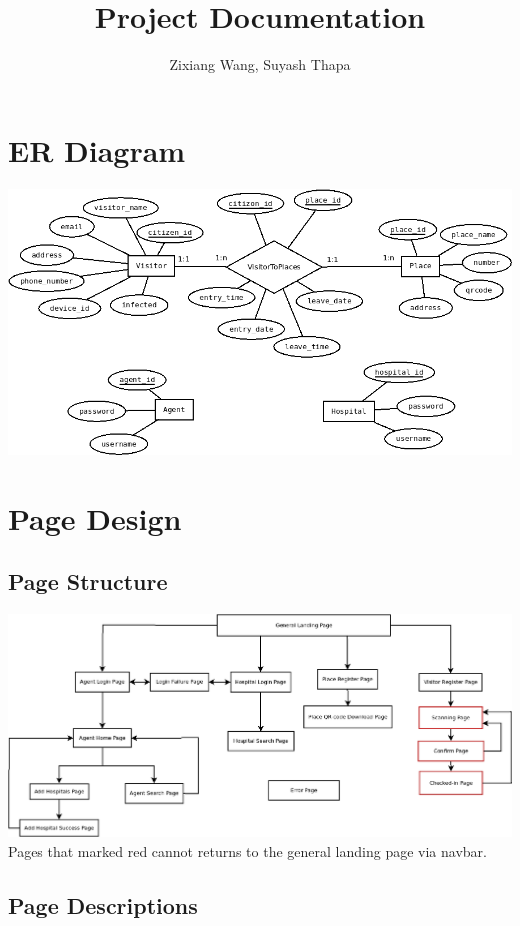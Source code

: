 \documentclass{article}
\author{Zixiang Wang, Suyash Thapa}
\title{Project Documentation}
\begin{document}
\maketitle

\section{ER Diagram}
\includegraphics[scale=0.5]{./er-diagram.png}

\section{Page Design}

\subsection*{Page Structure}

\includegraphics[scale=0.35]{./pages-structure.png}
Pages that marked red cannot returns to the general landing page via navbar.

\subsection*{Page Descriptions}
\end{document}
